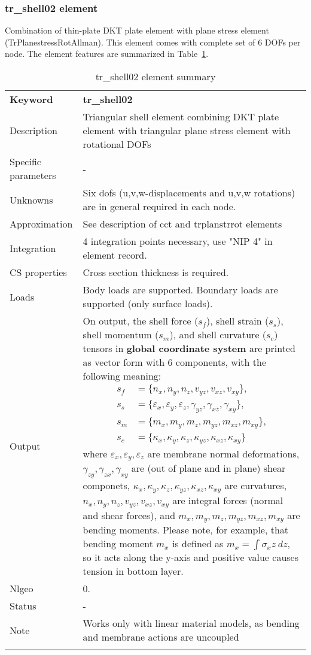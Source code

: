 \documentclass[a4paper]{article}
\newcommand{\param}[1]{\texttt{#1}} %
\newcommand{\templabel}{}%
\newcommand{\tempcaption}{}%
\newcounter{nelpar}
\newenvironment{elementsummary}[5]{%
  \gdef\tempcaption{#4}%
  \gdef\templabel{#5}%
  \setcounter{nelpar}{0}%
  \begin{center} %
    \begin{table}[!htb] %
      \begin{tabular}{|l|p{9cm}|}\hline %
        {\bf Keyword} & \bf{#1}\\ %
        {Description} & {#2}\\ %
        {Specific parameters} & {#3}\\ \hline %
}{
  \\ \hline %
      \end{tabular}%
      \caption{\tempcaption}%
      \label{\templabel}%
    \end{table}%
  \end{center}%
}
\newcommand{\elementParam}[1]{%
  \ifthenelse{\value{nelpar}>0} %
             {&{#1}}%
             {\setcounter{nelpar}{1}Parameters&{#1}}%
             \\%
}
\newcommand{\elementDescription}[2]{{#1} & {#2}\\ }
\begin{document}
\subsubsection {tr\_shell02 element}
Combination of thin-plate DKT plate element with plane stress element (TrPlanestressRotAllman). This element comes with complete set of 6 DOFs per node. 
The element features are summarized in Table~\ref{trshell02summary}.

\begin{elementsummary}{tr\_shell02}{Triangular shell element combining DKT plate element with triangular plane stress element with rotational DOFs}{-}{tr\_shell02 element summary}{trshell02summary}
\elementDescription{Unknowns}{Six dofs (u,v,w-displacements and u,v,w rotations) are in general required in each node.}
\elementDescription{Approximation}{See description of cct and trplanstrrot elements}
\elementDescription{Integration}{4 integration points necessary, use "NIP 4" in element record.}
\elementDescription{CS properties}{Cross section thickness is required.}
\elementDescription{Loads}{Body loads are supported. Boundary loads are supported (only surface loads).}
\elementDescription{Output}{On output, the shell force ($s_f$), shell strain ($s_s$), shell momentum ($s_m$), and shell curvature ($s_c$) tensors in \textbf{global coordinate system} are printed as vector form with 6 components, with the following meaning:
\begin{align*}
s_f &= \{n_x, n_y, n_z, v_{yz}, v_{xz}, v_{xy}\},\\
s_s &= \{\varepsilon_x, \varepsilon_y, \varepsilon_z, \gamma_{yz}, \gamma_{xz}, \gamma_{xy}\},\\
s_m &= \{m_x, m_y, m_z, m_{yz}, m_{xz}, m_{xy}\},\\
s_c &= \{\kappa_x, \kappa_y, \kappa_z, \kappa_{yz}, \kappa_{xz}, \kappa_{xy}\}
\end{align*}
where $\varepsilon_x, \varepsilon_y, \varepsilon_z$ are membrane normal deformations, $\gamma_{zy}, \gamma_{zx}, \gamma_{xy}$ are (out of plane and in plane) shear componets, $\kappa_x, \kappa_y, \kappa_z, \kappa_{yz}, \kappa_{xz}, \kappa_{xy}$ are curvatures, $n_x, n_y, n_z, v_{yz}, v_{xz}, v_{xy}$ are integral forces (normal and shear forces), and $m_x, m_y, m_z, m_{yz}, m_{xz}, m_{xy}$ are bending moments. 
Please note, for example, that bending moment $m_x$ is defined as $m_x=\int \sigma_x z\ dz$, so it acts along the y-axis and positive value causes tension in bottom layer.}
\elementDescription{Nlgeo}{0.}
\elementDescription{Status}{-}
\elementDescription{Note}{Works only with linear material models, as bending and membrane actions are uncoupled}
\end{elementsummary}
\end{document}
